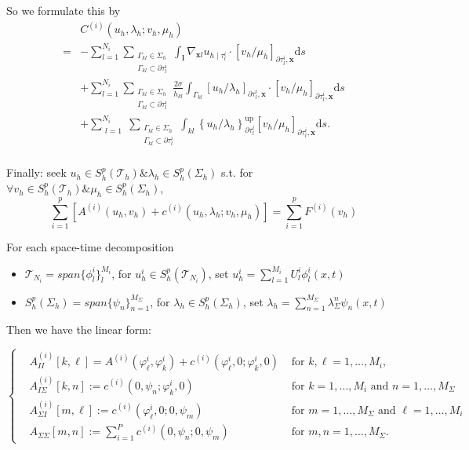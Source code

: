 So we formulate this by 
$$\begin{aligned}
    &C^{(i)}(u_h,\lambda_h;v_h,\mu_h)\\
    =&-\sum_{l=1}^{N_{i}} \sum_{\substack{\Gamma_{k l} \in \Sigma_{h} \\
    \Gamma_{k l} \subset \partial \tau_{l}^{i}}} \int_{\boldsymbol{l}} \nabla_{\boldsymbol{x} l} u_{h \mid \tau_{l}^{i}} \cdot\left[v_{h} / \mu_{h}\right]_{\partial \tau_{l}^{i}, \boldsymbol{x}} \mathrm{d} s \\
    &+\sum_{l=1}^{N_{i}} \sum_{\substack{\Gamma_{k l} \in \Sigma_{h} \\
    \Gamma_{k l} \subset \partial \tau_{l}^{i}}} \frac{2 \sigma}{\bar{h}_{k l}} \int_{\Gamma_{k l}}\left[u_{h} / \lambda_{h}\right]_{\partial \tau_{l}^{i}, \boldsymbol{x}} \cdot\left[v_{h} / \mu_{h}\right]_{\partial \tau_{l}^{i}, \boldsymbol{x}} \mathrm{d} s \\
    &+\sum_{\substack{l=1}}^{N_{i}} \sum_{\substack{\Gamma_{k l} \in \Sigma_{h} \\
    \Gamma_{k l} \subset \partial \tau_{l}^{i}}} \int_{k l}\left\{u_{h} / \lambda_{h}\right\}_{\partial \tau_{l}^{i}}^{\mathrm{up}}\left[v_{h} / \mu_{h}\right]_{\partial \tau_{l}^{i}, \boldsymbol{x}} \mathrm{d} s . \\
\end{aligned}$$

Finally: seek $u_h\in S_h^p(\mathscr{T}_h)\& \lambda_h\in S_h^p(\Sigma_h)$ s.t. for $\forall v_h\in S_h^p(\mathscr{T}_h)\& \mu_h\in S_h^p(\Sigma_h)$,
$$\sum_{i=1}^{p}\left[A^{(i)}(u_h,v_h)+c^{(i)}(u_h,\lambda_h;v_h,\mu_h)\right]=\sum_{i=1}^{p}F^{(i)}(v_h)$$

For each space-time decomposition
\begin{itemize}
    \item $\mathscr{T}_{N_i}=span\{\phi_l^i\}^{M_i}_l$, for $u_h^i\in S_h^p(\mathscr{T}_{N_i})$, set $u_h^i=\sum_{l=1}^{M_i}U_l^i\phi_l^i(x,t)$
    \item $S_h^p(\Sigma_h)=span\{\psi_n\}_{n=1}^{M_\Sigma}$, for $\lambda_h\in S_h^p(\Sigma_h)$, set $\lambda_h=\sum_{n=1}^{M_\Sigma}\lambda_\Sigma^n\psi_n(x,t)$
\end{itemize}

Then we have the linear form:

$$\left\{\begin{aligned}
    &A_{I I}^{(i)}[k, \ell]  =A^{(i)}\left(\varphi_{\ell}^{i}, \varphi_{k}^{i}\right)+c^{(i)}\left(\varphi_{\ell}^{i}, 0 ; \varphi_{k}^{i}, 0\right) & \text { for } k, \ell=1, \ldots, M_{i}, \\
    &A_{I \Sigma}^{(i)}[k, n]:=c^{(i)}\left(0, \psi_{n} ; \varphi_{k}^{i}, 0\right) & \text { for } k=1, \ldots, M_{i} \text { and } n=1, \ldots, M_{\Sigma} \\
    &A_{\Sigma I}^{(i)}[m, \ell]  :=c^{(i)}\left(\varphi_{\ell}^{i}, 0 ; 0, \psi_{m}\right) & \text { for } m=1, \ldots, M_{\Sigma} \text { and } \ell=1, \ldots, M_{i}\\
    &A_{\Sigma \Sigma}[m, n]:=\sum_{i=1}^{P} c^{(i)}\left(0, \psi_{n} ; 0, \psi_{m}\right) & \text { for } m, n=1, \ldots, M_{\Sigma} .
\end{aligned}\right.$$
    
